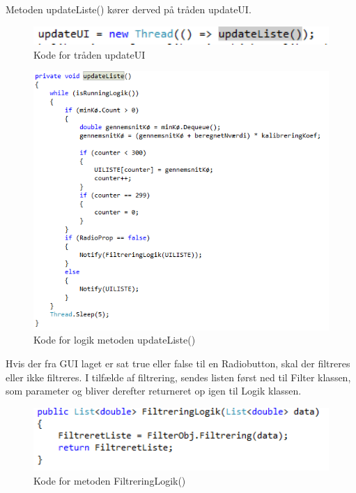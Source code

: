 Metoden updateListe() kører derved på tråden updateUI.

\begin{figure}[H]
	\centering
	\includegraphics[width=1.0\textwidth]{FigurerProgram/updateUI}
	\caption{Kode for tråden updateUI}
\end{figure}

\begin{figure}[H]
	\centering
	\includegraphics[width=1.0\textwidth]{FigurerProgram/updateListe}
	\caption{Kode for logik metoden updateListe()}
\end{figure}

Hvis der fra GUI laget er sat true eller false til en Radiobutton, skal der filtreres eller ikke filtreres. I tilfælde af filtrering, sendes listen først ned til Filter klassen, som parameter og bliver derefter returneret op igen til Logik klassen.

\begin{figure}[H]
	\centering
	\includegraphics[width=1.0\textwidth]{FigurerProgram/FiltreringLogik}
	\caption{Kode for metoden FiltreringLogik()}
\end{figure}

